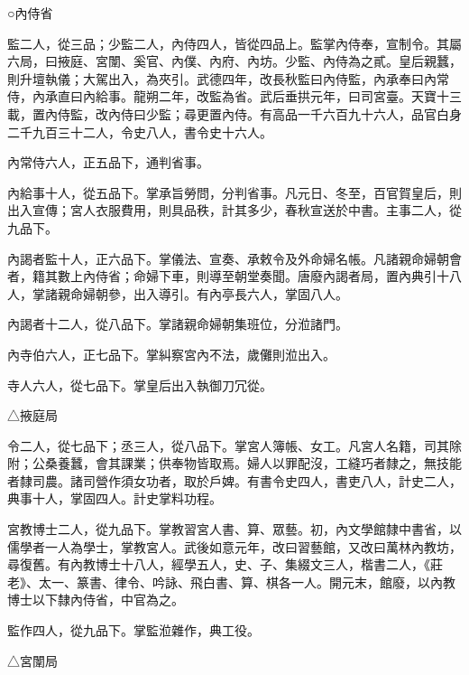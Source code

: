 \begin{pinyinscope}
 ○內侍省



 監二人，從三品；少監二人，內侍四人，皆從四品上。監掌內侍奉，宣制令。其屬六局，曰掖庭、宮闈、奚官、內僕、內府、內坊。少監、內侍為之貳。皇后親蠶，則升壇執儀；大駕出入，為夾引。武德四年，改長秋監曰內侍監，內承奉曰內常侍，內承直曰內給事。龍朔二年，改監為省。武后垂拱元年，曰司宮臺。天寶十三載，置內侍監，改內侍曰少監；尋更置內侍。有高品一千六百九十六人，品官白身二千九百三十二人，令史八人，書令史十六人。



 內常侍六人，正五品下，通判省事。



 內給事十人，從五品下。掌承旨勞問，分判省事。凡元日、冬至，百官賀皇后，則出入宣傳；宮人衣服費用，則具品秩，計其多少，春秋宣送於中書。主事二人，從九品下。



 內謁者監十人，正六品下。掌儀法、宣奏、承敕令及外命婦名帳。凡諸親命婦朝會者，籍其數上內侍省；命婦下車，則導至朝堂奏聞。唐廢內謁者局，置內典引十八人，掌諸親命婦朝參，出入導引。有內亭長六人，掌固八人。



 內謁者十二人，從八品下。掌諸親命婦朝集班位，分涖諸門。



 內寺伯六人，正七品下。掌糾察宮內不法，歲儺則涖出入。



 寺人六人，從七品下。掌皇后出入執御刀冗從。



 △掖庭局



 令二人，從七品下；丞三人，從八品下。掌宮人簿帳、女工。凡宮人名籍，司其除附；公桑養蠶，會其課業；供奉物皆取焉。婦人以罪配沒，工縫巧者隸之，無技能者隸司農。諸司營作須女功者，取於戶婢。有書令史四人，書吏八人，計史二人，典事十人，掌固四人。計史掌料功程。



 宮教博士二人，從九品下。掌教習宮人書、算、眾藝。初，內文學館隸中書省，以儒學者一人為學士，掌教宮人。武後如意元年，改曰習藝館，又改曰萬林內教坊，尋復舊。有內教博士十八人，經學五人，史、子、集綴文三人，楷書二人，《莊老》、太一、篆書、律令、吟詠、飛白書、算、棋各一人。開元末，館廢，以內教博士以下隸內侍省，中官為之。



 監作四人，從九品下。掌監涖雜作，典工役。



 △宮闈局




\end{pinyinscope}
